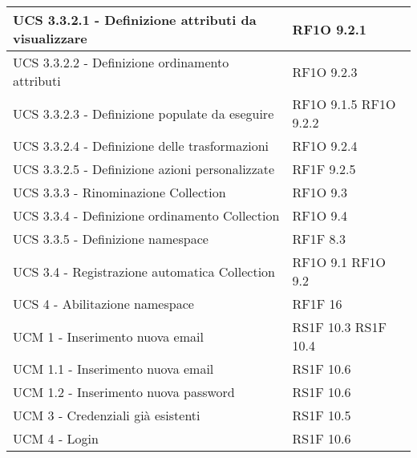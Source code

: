 \begin{center}
\begin{longtable}{ | p{5cm} | p{5cm} |}
            UCS 3.3.2.1 -  Definizione attributi da visualizzare &  RF1O 9.2.1 \newline  \\ \hline      
            UCS 3.3.2.2 - Definizione ordinamento attributi &  RF1O 9.2.3 \newline  \\ \hline      
            UCS 3.3.2.3 - Definizione populate da eseguire &  RF1O 9.1.5 \newline  RF1O 9.2.2 \newline  \\ \hline      
            UCS 3.3.2.4 - Definizione delle trasformazioni &  RF1O 9.2.4 \newline  \\ \hline      
            UCS 3.3.2.5 - Definizione azioni personalizzate &  RF1F 9.2.5 \newline  \\ \hline      
            UCS 3.3.3  - Rinominazione Collection &  RF1O 9.3 \newline  \\ \hline      
            UCS 3.3.4  - Definizione ordinamento Collection &  RF1O 9.4 \newline  \\ \hline      
            UCS 3.3.5 - Definizione namespace &  RF1F 8.3 \newline  \\ \hline      
            UCS 3.4  - Registrazione automatica Collection &  RF1O 9.1 \newline  RF1O 9.2 \newline  \\ \hline      
            UCS 4 - Abilitazione namespace &  RF1F 16 \newline  \\ \hline      
            UCM 1 -  Inserimento nuova email &  RS1F 10.3 \newline  RS1F 10.4 \newline  \\ \hline      
            UCM 1.1 -  Inserimento nuova email &  RS1F 10.6 \newline  \\ \hline      
            UCM 1.2 - Inserimento nuova password &  RS1F 10.6 \newline  \\ \hline      
            UCM 3 - Credenziali già esistenti &  RS1F 10.5 \newline  \\ \hline      
            UCM 4 - Login &  RS1F 10.6 \newline  \\ \hline      

\end{longtable}
\end{center}
